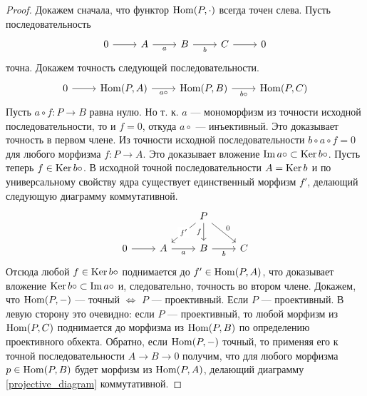 \documentclass[../main.tex]{subfiles}
\begin{document}
\begin{proof}
Докажем сначала, что функтор $\operatorname{Hom}(P, \cdot)$ всегда точен слева. Пусть последовательность
\begin{equation*}
    \begin{tikzcd}
	0 & A & B & C & 0
	\arrow[from=1-1, to=1-2]
	\arrow["a"', from=1-2, to=1-3]
	\arrow["b"', from=1-3, to=1-4]
	\arrow[from=1-4, to=1-5]
\end{tikzcd}
\end{equation*}
точна. Докажем точность следующей последовательности.
\begin{equation*}
    \begin{tikzcd}
	0 & {\Hom(P, A)} & {\Hom(P, B)} & {\Hom(P, C)}
	\arrow[from=1-1, to=1-2]
	\arrow["b\circ"', from=1-3, to=1-4]
	\arrow["a\circ"', from=1-2, to=1-3]
\end{tikzcd}
\end{equation*}
 Пусть $a\circ f:P\to B$ равна нулю. Но т. к. $a$ --- мономорфизм из точности исходной последовательности, то и $f=0$, откуда $a\circ$ --- инъективный. Это доказывает точность в первом члене.
Из точности исходной последовательности $b\circ a \circ f = 0$ для любого морфизма $f:P\to A$. Это доказывает вложение $\mathop{\mathrm{Im}}\nolimits a\circ \subset \mathop{\mathrm{Ker}}\nolimits b\circ$. Пусть теперь $f \in \mathop{\mathrm{Ker}}\nolimits b\circ$. В исходной точной последовательности $A = \mathop{\mathrm{Ker}}\nolimits b$ и по универсальному свойству ядра существует единственный морфизм $f'$, делающий следующую диаграмму коммутативной.
 \begin{equation}\label{projective_diagram}
     \begin{tikzcd}
	&& P \\
	0 & A & B & C
	\arrow["f"', from=1-3, to=2-3]
	\arrow["b"', from=2-3, to=2-4]
	\arrow["a"', from=2-2, to=2-3]
	\arrow["{f'}"{description}, from=1-3, to=2-2]
	\arrow[from=2-1, to=2-2]
	\arrow["0", from=1-3, to=2-4]
\end{tikzcd}
 \end{equation}
Отсюда любой $f\in \mathop{\mathrm{Ker}}\nolimits b\circ$ поднимается до $f' \in \operatorname{Hom}(P, A)$, что доказывает вложение $\mathop{\mathrm{Ker}}\nolimits b\circ \subset \mathop{\mathrm{Im}}\nolimits a\circ$ и, следовательно, точность во втором члене.
Докажем, что $\operatorname{Hom}(P, -)$ --- точный $\iff$ $P$ --- проективный. Если $P$ --- проективный. В левую сторону это очевидно: если $P$ --- проективный, то любой морфизм из $\operatorname{Hom} (P, C)$ поднимается до морфизма из $\operatorname{Hom} (P, B)$ по определению проективного обхекта. Обратно, если $\operatorname{Hom}(P, -)$ точный, то применяя его к точной последовательности $A\to B \to 0$ получим, что для любого морфизма $p\in \operatorname{Hom}(P, B)$ будет морфизм из $\operatorname{Hom}(P, A)$, делающий диаграмму \eqref{projective_diagram} коммутативной.
\end{proof}
\end{document}
